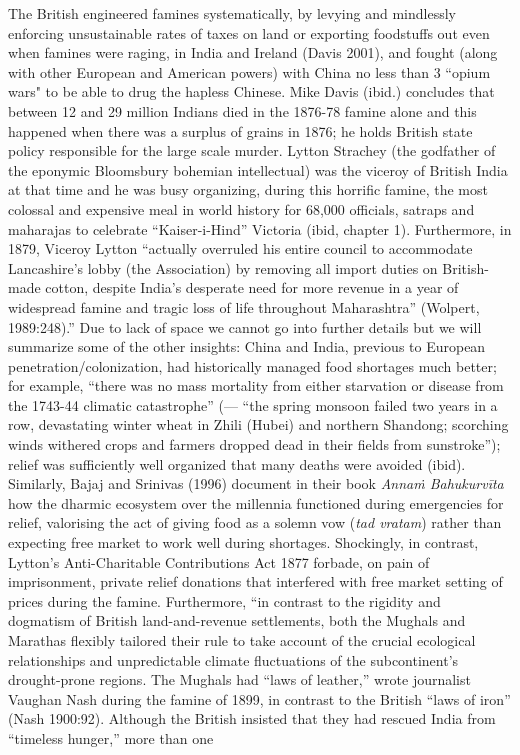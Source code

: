 The British engineered famines systematically, by levying and mindlessly enforcing unsustainable rates of taxes on land or exporting foodstuffs out even when famines were raging, in India and Ireland (Davis 2001), and fought (along with other European and American powers) with China no less than 3 ``opium wars" to be able to drug the hapless Chinese. Mike Davis (ibid.) concludes that between 12 and 29 million Indians died in the 1876-78 famine alone and this happened when there was a surplus of grains in 1876; he holds British state policy responsible for the large scale murder. Lytton Strachey (the godfather of the eponymic Bloomsbury bohemian intellectual) was the viceroy of British India at that time and he was busy organizing, during this horrific famine, the most colossal and expensive meal in world history for 68,000 officials, satraps and maharajas to celebrate “Kaiser-i-Hind” Victoria (ibid, chapter 1). Furthermore, in 1879, Viceroy Lytton “actually overruled his entire council to accommodate Lancashire’s lobby (the Association) by removing all import duties on British-made cotton, despite India’s desperate need for more revenue in a year of widespread famine and tragic loss of life throughout Maharashtra” (Wolpert, 1989:248).” Due to lack of space we cannot go into further details but we will summarize some of the other insights: China and India, previous to European penetration/colonization, had historically managed food shortages much better; for example, “there was no mass mortality from either starvation or disease from the 1743-44 climatic catastrophe” (--- “the spring monsoon failed two years in a row, devastating winter wheat in Zhili (Hubei) and northern Shandong; scorching winds withered crops and farmers dropped dead in their fields from sunstroke”); relief was sufficiently well organized that many deaths were avoided (ibid). Similarly, Bajaj and Srinivas (1996) document in their book {\sl Annaṁ Bahukurvīta} how the dharmic ecosystem over the millennia  functioned during emergencies for relief, valorising the act of giving food as a solemn vow ({\sl tad vratam}) rather than expecting free market to work well during shortages. Shockingly, in contrast, Lytton's Anti-Charitable Contributions Act 1877 forbade, on pain of imprisonment, private relief donations that interfered with free market setting of prices during the famine.  Furthermore, “in contrast to the rigidity and dogmatism of British land-and-revenue settlements, both the Mughals and Marathas flexibly tailored their rule to take account of the crucial ecological relationships and unpredictable climate fluctuations of the subcontinent’s drought-prone regions. The Mughals had “laws of leather,” wrote journalist Vaughan Nash during the famine of 1899, in contrast to the British “laws of iron” (Nash 1900:92). Although the British insisted that they had rescued India from “timeless hunger,” more than one 